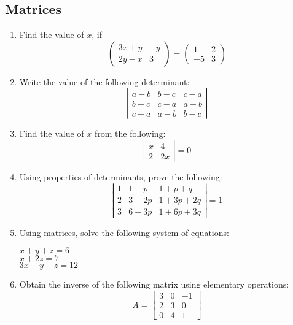 \documentclass{article}
\begin{document}
\subsection*{Matrices}
\begin{enumerate}
\item Find the value of $x$, if
\newcommand{\myvec}[1]{\left(\begin{matrix} #1 \end{matrix}\right)}
\[
\myvec{3x + y & -y \\
       2y - x & 3}
           =
\myvec{1 & 2 \\
       -5 & 3}
\]
\item Write the value of the following determinant:\\
\newcommand{\mydet}[1]{\left| #1 \right|}
\[
\mydet{
\begin{matrix}
a - b & b - c & c - a \\ 
b - c & c - a & a - b \\ 
c - a & a - b & b - c
\end{matrix}
}
\]
\item Find the value of $x$ from the following:\\
\[
\mydet{
\begin{matrix}
x & 4 \\
2 & 2x
\end{matrix}
} = 0
\]
\item Using properties of determinants, prove the following:\\
\[
\mydet{
\begin{matrix}
1 & 1 + p & 1 + p + q \\
2 & 3 + 2p & 1 + 3p + 2q \\
3 & 6 + 3p & 1 + 6p + 3q
\end{matrix}
} = 1
\]
\item Using matrices, solve the following system of equations:\\
\begin{center}
		$x+y+z = 6$\\
		$x+2z = 7$\\
		$3x+y+z = 12$
\end{center}
\item Obtain the inverse of the following matrix using elementary operations:\\
\[
A = \begin{bmatrix}
3 & 0 & -1 \\
2 & 3 & 0 \\
0 & 4 & 1
\end{bmatrix}
\]
\end{enumerate}
\end{document}
